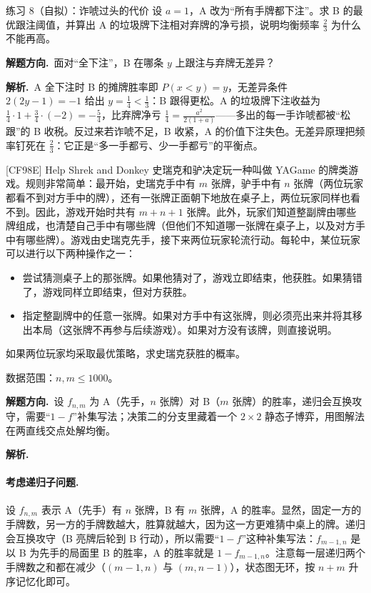 \documentclass[UTF8,a4paper,11pt,oneside,openany,fontset=fandol]{ctexbook}
\theoremstyle{definition}
\newcommand{\sol}{\par\noindent\textbf{解析.}\ }
\newcommand{\hint}{\par\noindent\textbf{解题方向.}\ }
\begin{document}
\begin{problem}{练习 8（自拟）：诈唬过头的代价}
设 $a=1$，A 改为“所有手牌都下注”。求 B 的最优跟注阈值，并算出 A 的垃圾牌下注相对弃牌的净亏损，说明均衡频率 $\tfrac23$ 为什么不能再高。
\end{problem}

\hint 面对“全下注”，B 在哪条 $y$ 上跟注与弃牌无差异？

\sol A 全下注时 B 的摊牌胜率即 $P(x<y)=y$，无差异条件 $2(2y-1)=-1$ 给出 $y=\tfrac14<\tfrac13$：B 跟得更松。A 的垃圾牌下注收益为 $\tfrac14\cdot 1+\tfrac34\cdot(-2)=-\tfrac54$，比弃牌净亏 $\tfrac14=\tfrac{a^{2}}{2(1+a)}$——多出的每一手诈唬都被“松跟”的 B 收税。反过来若诈唬不足，B 收紧，A 的价值下注失色。无差异原理把频率钉死在 $\tfrac23$：它正是“多一手都亏、少一手都亏”的平衡点。
\begin{problem}{[CF98E] Help Shrek and Donkey}
史瑞克和驴决定玩一种叫做 YAGame 的牌类游戏。规则非常简单：最开始，史瑞克手中有 $m$ 张牌，驴手中有 $n$ 张牌（两位玩家都看不到对方手中的牌），还有一张牌正面朝下地放在桌子上，两位玩家同样也看不到。因此，游戏开始时共有 $m+n+1$ 张牌。此外，玩家们知道整副牌由哪些牌组成，也清楚自己手中有哪些牌（但他们不知道哪一张牌在桌子上，以及对方手中有哪些牌）。游戏由史瑞克先手，接下来两位玩家轮流行动。每轮中，某位玩家可以进行以下两种操作之一：
\begin{itemize}
\item 尝试猜测桌子上的那张牌。如果他猜对了，游戏立即结束，他获胜。如果猜错了，游戏同样立即结束，但对方获胜。
\item 指定整副牌中的任意一张牌。如果对方手中有这张牌，则必须亮出来并将其移出本局（这张牌不再参与后续游戏）。如果对方没有该牌，则直接说明。
\end{itemize}
如果两位玩家均采取最优策略，求史瑞克获胜的概率。

数据范围：$n,m\le1000$。
\end{problem}

\hint 设 $f_{n,m}$ 为 A（先手，$n$ 张牌）对 B（$m$ 张牌）的胜率，递归会互换攻守，需要“$1-f$”补集写法；决策二的分支里藏着一个 $2\times2$ 静态子博弈，用图解法在两直线交点处解均衡。

\sol \paragraph{考虑递归子问题.} 设 $f_{n,m}$ 表示 A（先手）有 $n$ 张牌，B 有 $m$ 张牌，A 的胜率。显然，固定一方的手牌数，另一方的手牌数越大，胜算就越大，因为这一方更难猜中桌上的牌。递归会互换攻守（B 亮牌后轮到 B 行动），所以需要“$1-f$”这种补集写法：$f_{m-1,n}$ 是以 B 为先手的局面里 B 的胜率，A 的胜率就是 $1-f_{m-1,n}$。注意每一层递归两个手牌数之和都在减少（$(m-1,n)$ 与 $(m,n-1)$），状态图无环，按 $n+m$ 升序记忆化即可。
\end{document}

